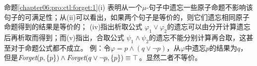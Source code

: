 命题\ref{chapter06:pro:ctl:forget:1}(i) 表明从一个$\mu$-句子中遗忘一些原子命题不影响该句子的可满足性；从(ii)可以看出，如果两个句子是等价的，则它们遗忘相同原子命题得到的结果是等价的； (iv)指出析取公式 $\varphi_1 \vee \varphi_2$的遗忘可以由分开计算遗忘后再析取而得到；而(v)指出，合取公式 $\psi_1 \wedge \psi_2$的遗忘不能分别计算再合取，这甚至对于命题公式都不成立。
例：令$\varphi=p \wedge (q \vee \neg p)$，从$\varphi$中遗忘$p$的结果为$q$，但是$\textit{Forget}(p, \{p\}) \wedge \textit{Forget}(q\vee \neg p, \{p\}) \equiv \top$。显然二者不等价。






